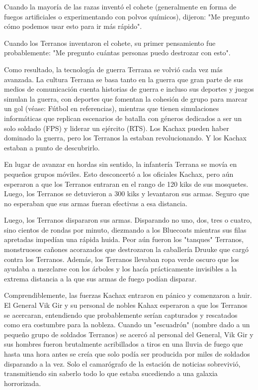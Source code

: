\documentclass[spanish,12pt,a4paper,oneside,titlepage, twocolumn]{article}
\begin{document}
    Cuando la mayoría de las razas inventó el cohete (generalmente en forma de fuegos artificiales o experimentando con polvos químicos), dijeron: "Me pregunto cómo podemos usar esto para ir más rápido".

    Cuando los Terranos inventaron el cohete, su primer pensamiento fue probablemente: "Me pregunto cuántas personas puedo destrozar con esto".

    Como resultado, la tecnología de guerra Terrana se volvió cada vez más avanzada. La cultura Terrana se basa tanto en la guerra que gran parte de sus medios de comunicación cuenta historias de guerra e incluso sus deportes y juegos simulan la guerra, con deportes que fomentan la cohesión de grupo para marcar un gol (véase: Fútbol en referencias), mientras que tienen simulaciones informáticas que replican escenarios de batalla con géneros dedicados a ser un solo soldado (FPS) y liderar un ejército (RTS). Los Kachax pueden haber dominado la guerra, pero los Terranos la estaban revolucionando. Y los Kachax estaban a punto de descubrirlo.

    En lugar de avanzar en hordas sin sentido, la infantería Terrana se movía en pequeños grupos móviles. Esto desconcertó a los oficiales Kachax, pero aún esperaron a que los Terranos entraran en el rango de 120 kiks de sus mosquetes. Luego, los Terranos se detuvieron a 300 kiks y levantaron sus armas. Seguro que no esperaban que sus armas fueran efectivas a esa distancia.

    Luego, los Terranos dispararon sus armas. Disparando no uno, dos, tres o cuatro, sino cientos de rondas por minuto, diezmando a los Bluecoats mientras sus filas apretadas impedían una rápida huida. Peor aún fueron los "tanques" Terranos, monstruosos cañones acorazados que destrozaron la caballería Druuke que cargó contra los Terranos. Además, los Terranos llevaban ropa verde oscuro que los ayudaba a mezclarse con los árboles y los hacía prácticamente invisibles a la extrema distancia a la que sus armas de fuego podían disparar.

    Comprendiblemente, las fuerzas Kachax entraron en pánico y comenzaron a huir. El General Vik Gir y su personal de nobles Kahax esperaron a que los Terranos se acercaran, entendiendo que probablemente serían capturados y rescatados como era costumbre para la nobleza. Cuando un "escuadrón" (nombre dado a un pequeño grupo de soldados Terranos) se acercó al personal del General, Vik Gir y sus hombres fueron brutalmente acribillados a tiros en una lluvia de fuego que hasta una hora antes se creía que solo podía ser producida por miles de soldados disparando a la vez. Solo el camarógrafo de la estación de noticias sobrevivió, transmitiendo sin saberlo todo lo que estaba sucediendo a una galaxia horrorizada.
\end{document}
